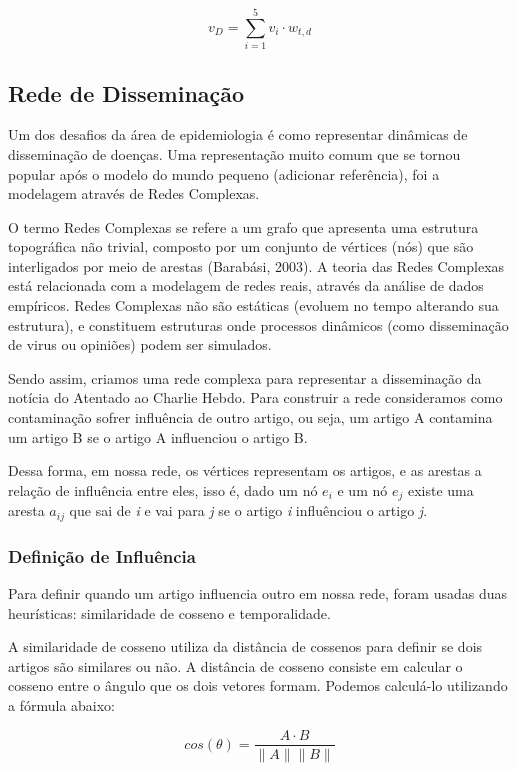 \documentclass[a4paper,12pt]{article}
\begin{document}
  $$v_{D} = \sum_{i=1}^{5} v_{i} \cdot w_{t,d} $$


\subsection{Rede de Disseminação}
 
 Um dos desafios da área de epidemiologia é como representar dinâmicas de disseminação de doenças. Uma representação muito comum que se tornou popular após o modelo
 do mundo pequeno (adicionar referência), foi a modelagem através de Redes Complexas.
 
 O termo Redes Complexas se refere a um grafo que apresenta uma estrutura topográfica não trivial, composto por um conjunto
 de vértices (nós) que são interligados por meio de arestas (Barabási, 2003). A teoria das Redes Complexas  está relacionada com a modelagem de redes reais, através da 
 análise de dados empíricos. Redes Complexas não são estáticas (evoluem no tempo alterando sua estrutura), e 
 constituem estruturas onde processos dinâmicos (como disseminação de virus ou opiniões) podem ser simulados.
 
 Sendo assim, criamos uma rede complexa para representar a disseminação da notícia do Atentado ao Charlie Hebdo. Para construir a rede
 consideramos como contaminação sofrer influência de outro artigo, ou seja, um artigo A contamina um artigo B se o artigo A influenciou o
 artigo B.
 
 Dessa forma, em nossa rede, os vértices representam os artigos, e as arestas a relação de influência entre eles, isso é, dado um nó $e_{i}$ e um nó
 $e_{j}$ existe uma aresta $a_{ij}$ que sai de \textit{i} e vai para \textit{j} se o artigo \textit{i} influênciou o artigo \textit{j}.
 
 
 
 
\subsubsection{Definição de Influência}
 
 Para definir quando um artigo influencia outro em nossa rede, foram usadas duas heurísticas: similaridade de cosseno e temporalidade.
 
 A similaridade de cosseno utiliza da distância de cossenos para definir se dois artigos são similares ou não. A distância de cosseno
 consiste em calcular o cosseno entre o ângulo que os dois vetores formam. Podemos calculá-lo utilizando a fórmula abaixo:
 
 $$ cos(\theta) = \dfrac{A \cdot B}{\parallel A\parallel \parallel B \parallel} $$
 
\end{document}
